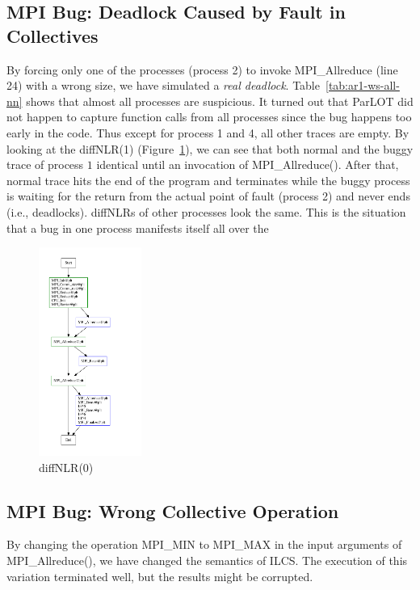 \subsection{MPI Bug: Deadlock Caused by Fault in Collectives}
By forcing only one of the processes (process 2) to invoke MPI\_Allreduce (line 24) with a wrong size, we have simulated a \textit{real deadlock}. 
%
Table~\ref{tab:ar1-ws-all-nn} shows that almost all processes are suspicious.
%
It turned out that ParLOT did not happen to capture function calls from all processes since the bug happens too early in the code. Thus except for process 1 and 4, all other traces are empty.
%
By looking at the diffNLR(1) (Figure~\ref{diffNLR-0}), we can see that both normal and the buggy trace of process $1$ identical until an invocation of MPI\_Allreduce(). After that, normal trace hits the end of the program and terminates while the buggy process is waiting for the return from the actual point of fault (process 2) and never ends (i.e., deadlocks). 
%
diffNLRs of other processes look the same.
%
This is the situation that a bug in one process manifests itself all over the 


\begin{figure}[]
\centering
\includegraphics[width=0.3\textwidth]{figs/diffNLR/mpiBug-all-nn.pdf}
\caption{diffNLR(0)}
\label{diffNLR-0}
\end{figure}
%



\subsection{MPI Bug: Wrong Collective Operation}
By changing the operation MPI\_MIN to MPI\_MAX in the input arguments of MPI\_Allreduce(), we have changed the semantics of ILCS. 
%
The execution of this variation terminated well, but the results might be corrupted.
%

